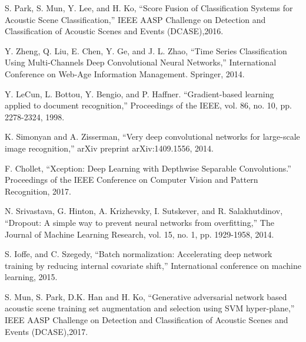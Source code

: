 \documentclass[conference]{IEEEtran}
\begin{document}
\begin{thebibliography}{00}
 S. Park, S. Mun, Y. Lee, and H. Ko, ``Score Fusion of Classification Systems for Acoustic Scene Classification,'' IEEE AASP Challenge on Detection and Classification of Acoustic Scenes and Events (DCASE),2016.

 Y. Zheng, Q. Liu, E. Chen, Y. Ge, and J. L. Zhao, ``Time Series Classification Using Multi-Channels Deep Convolutional Neural Networks,'' International Conference on Web-Age Information Management. Springer, 2014.

 Y. LeCun, L. Bottou, Y. Bengio, and P. Haffner. ``Gradient-based learning applied to document recognition,'' Proceedings of the IEEE, vol. 86, no. 10, pp. 2278-2324, 1998.

 K. Simonyan and A. Zisserman, ``Very deep convolutional networks for large-scale image recognition,'' arXiv preprint arXiv:1409.1556, 2014.

 F. Chollet, ``Xception: Deep Learning with Depthwise Separable Convolutions.'' Proceedings of the IEEE Conference on Computer Vision and Pattern Recognition, 2017.

 N. Srivastava, G. Hinton, A. Krizhevsky, I. Sutskever, and R. Salakhutdinov,  ``Dropout: A simple way to prevent neural networks from overfitting,''  The Journal of Machine Learning Research, vol. 15, no. 1, pp. 1929-1958, 2014.

 S. Ioffe, and C. Szegedy, ``Batch normalization: Accelerating deep network training by reducing internal covariate shift,'' International conference on machine learning, 2015.

 S. Mun, S. Park, D.K. Han and  H. Ko, ``Generative adversarial network based acoustic scene training set augmentation and selection using SVM hyper-plane,'' IEEE AASP Challenge on Detection and Classification of Acoustic Scenes and Events (DCASE),2017.

\end{thebibliography}
\end{document}
